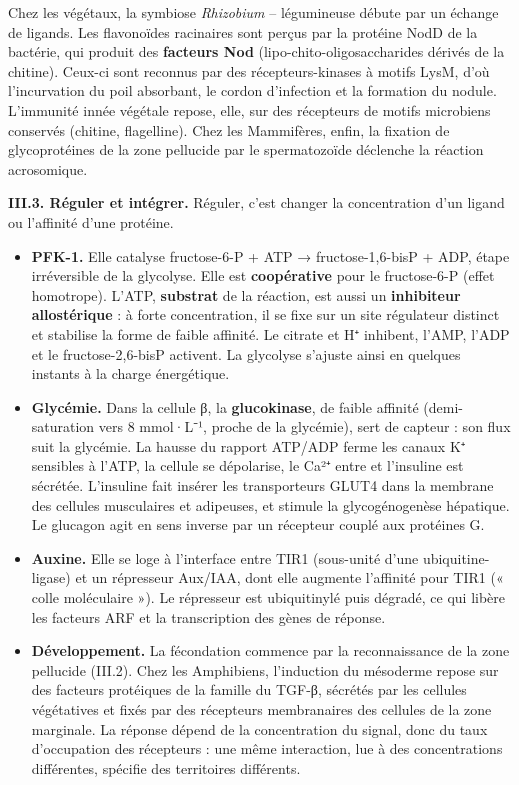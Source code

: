 \documentclass[11pt,a4paper]{article}
\providecommand{\tightlist}{\setlength{\itemsep}{0pt}\setlength{\parskip}{0pt}}
\begin{document}
Chez les végétaux, la symbiose \emph{Rhizobium} -- légumineuse débute par un échange de ligands. Les flavonoïdes racinaires sont perçus par la protéine NodD de la bactérie, qui produit des \textbf{facteurs Nod} (lipo-\allowbreak{}chito-\allowbreak{}oligosaccharides dérivés de la chitine). Ceux-ci sont reconnus par des récepteurs-kinases à motifs LysM, d'où l'incurvation du poil absorbant, le cordon d'infection et la formation du nodule. L'immunité innée végétale repose, elle, sur des récepteurs de motifs microbiens conservés (chitine, flagelline). Chez les Mammifères, enfin, la fixation de glycoprotéines de la zone pellucide par le spermatozoïde déclenche la réaction acrosomique.

\textbf{III.3. Réguler et intégrer.} Réguler, c'est changer la concentration d'un ligand ou l'affinité d'une protéine.

\begin{itemize}
\tightlist
\item
  \textbf{PFK-1.} Elle catalyse fructose-6-P + ATP → fructose-1,6-bisP + ADP, étape irréversible de la glycolyse. Elle est \textbf{coopérative} pour le fructose-6-P (effet homotrope). L'ATP, \textbf{substrat} de la réaction, est aussi un \textbf{inhibiteur allostérique} : à forte concentration, il se fixe sur un site régulateur distinct et stabilise la forme de faible affinité. Le citrate et H⁺ inhibent, l'AMP, l'ADP et le fructose-2,6-bisP activent. La glycolyse s'ajuste ainsi en quelques instants à la charge énergétique.
\item
  \textbf{Glycémie.} Dans la cellule β, la \textbf{glucokinase}, de faible affinité (demi-saturation vers 8 mmol·L⁻¹, proche de la glycémie), sert de capteur : son flux suit la glycémie. La hausse du rapport ATP/ADP ferme les canaux K⁺ sensibles à l'ATP, la cellule se dépolarise, le Ca²⁺ entre et l'insuline est sécrétée. L'insuline fait insérer les transporteurs GLUT4 dans la membrane des cellules musculaires et adipeuses, et stimule la glycogénogenèse hépatique. Le glucagon agit en sens inverse par un récepteur couplé aux protéines G.
\item
  \textbf{Auxine.} Elle se loge à l'interface entre TIR1 (sous-unité d'une ubiquitine-ligase) et un répresseur Aux/IAA, dont elle augmente l'affinité pour TIR1 (« colle moléculaire »). Le répresseur est ubiquitinylé puis dégradé, ce qui libère les facteurs ARF et la transcription des gènes de réponse.
\item
  \textbf{Développement.} La fécondation commence par la reconnaissance de la zone pellucide (III.2). Chez les Amphibiens, l'induction du mésoderme repose sur des facteurs protéiques de la famille du TGF-β, sécrétés par les cellules végétatives et fixés par des récepteurs membranaires des cellules de la zone marginale. La réponse dépend de la concentration du signal, donc du taux d'occupation des récepteurs : une même interaction, lue à des concentrations différentes, spécifie des territoires différents.
\end{itemize}
\end{document}
